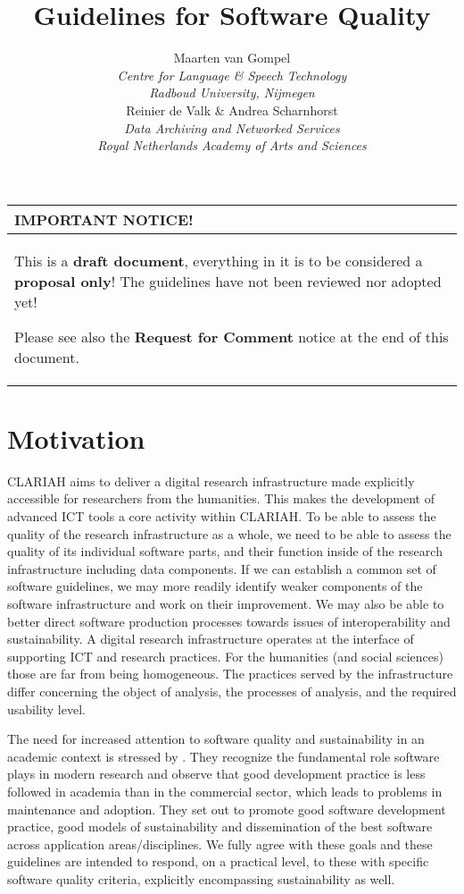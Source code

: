 \documentclass[a4paper,11pt]{article}
\newcommand{\subtitle}[1]{%
  \posttitle{%
    \par\end{center}
    \begin{center}\large#1\end{center}
    \vskip0.5em}%
}
\newenvironment{notice}{
\begin{center}
    \begin{tabular}[h!]{|p{0.8\textwidth}|}
    \hline
    {\bf IMPORTANT NOTICE!}\\\hline}
{   \\\hline
    \end{tabular}
\end{center}}
\begin{document}
\title{Guidelines for Software Quality}
\subtitle{CLARIAH Task 54.100} 
\author{Maarten van Gompel \\ \emph{Centre for Language \& Speech Technology} \\
\emph{Radboud University, Nijmegen} \\  Reinier de Valk \& Andrea Scharnhorst
\\ \emph{Data Archiving and Networked Services} \\ \emph{Royal Netherlands Academy of Arts and Sciences}}


\maketitle

\begin{notice} 
This is a \textbf{draft document}, everything in it is to be considered a
\textbf{proposal only}! The guidelines have not been reviewed nor adopted yet!

Please see also the \textbf{Request for Comment} notice at the end of this document.
\end{notice}

\tableofcontents

\section{Motivation}

CLARIAH aims to deliver a digital research infrastructure made explicitly
accessible for researchers from the humanities. This makes the development of
advanced ICT tools a core activity within CLARIAH. To be able to assess the
quality of the research infrastructure as a whole, we need to be able to assess
the quality of its individual software parts, and their function inside of the
research infrastructure including data components. If we can establish a common
set of software guidelines, we may more readily identify weaker components of
the software infrastructure and work on their improvement. We may also be able
to better direct software production processes towards issues of
interoperability and sustainability.  A digital research infrastructure
operates at the interface of supporting ICT and research practices. For the
humanities (and social sciences) those are far from being homogeneous. The
practices served by the infrastructure differ concerning the object of
analysis, the processes of analysis, and the required usability level. 

The need for increased attention to software quality and sustainability in an
academic context is stressed by
\cite{RESEARCHSOFTWARE}.
They recognize the fundamental role software plays in modern research and
observe that good development practice is less followed in academia than in the
commercial sector, which leads to problems in maintenance and adoption. They
set out to promote good software development practice, good models of
sustainability and dissemination of the best software across application
areas/disciplines. We fully agree with these goals and these guidelines are
intended to respond, on a practical level, to these with specific software
quality criteria, explicitly encompassing sustainability as well.
\end{document}
